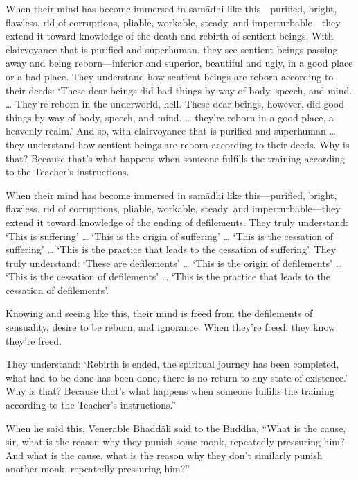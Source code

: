 \documentclass[12pt,openany]{book}%
\begin{document}
When their mind has become immersed in \textsanskrit{samādhi} like this—purified, bright, flawless, rid of corruptions, pliable, workable, steady, and imperturbable—they extend it toward knowledge of the death and rebirth of sentient beings. With clairvoyance that is purified and superhuman, they see sentient beings passing away and being reborn—inferior and superior, beautiful and ugly, in a good place or a bad place. They understand how sentient beings are reborn according to their deeds: ‘These dear beings did bad things by way of body, speech, and mind. … They’re reborn in the underworld, hell. These dear beings, however, did good things by way of body, speech, and mind. … they’re reborn in a good place, a heavenly realm.’ And so, with clairvoyance that is purified and superhuman … they understand how sentient beings are reborn according to their deeds. Why is that? Because that’s what happens when someone fulfills the training according to the Teacher’s instructions. 

When their mind has become immersed in \textsanskrit{samādhi} like this—purified, bright, flawless, rid of corruptions, pliable, workable, steady, and imperturbable—they extend it toward knowledge of the ending of defilements. They truly understand: ‘This is suffering’ … ‘This is the origin of suffering’ … ‘This is the cessation of suffering’ … ‘This is the practice that leads to the cessation of suffering’. They truly understand: ‘These are defilements’ … ‘This is the origin of defilements’ … ‘This is the cessation of defilements’ … ‘This is the practice that leads to the cessation of defilements’. 

Knowing and seeing like this, their mind is freed from the defilements of sensuality, desire to be reborn, and ignorance. When they’re freed, they know they’re freed. 

They understand: ‘Rebirth is ended, the spiritual journey has been completed, what had to be done has been done, there is no return to any state of existence.’ Why is that? Because that’s what happens when someone fulfills the training according to the Teacher’s instructions.” 

When he said this, Venerable \textsanskrit{Bhaddāli} said to the Buddha, “What is the cause, sir, what is the reason why they punish some monk, repeatedly pressuring him? And what is the cause, what is the reason why they don’t similarly punish another monk, repeatedly pressuring him?” 
\end{document}

